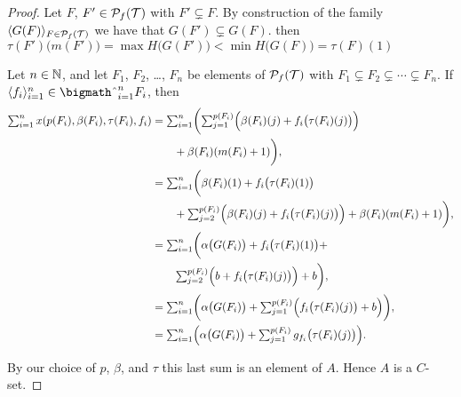 \begin{proof}
  Let $F$, $F' \in \mathcal{P}_f(\mathcal{T})$ with $F' \subsetneq F$. 
  By construction of the family $\langle G(F) \rangle_{F \in \mathcal{P}_f(\mathcal{T})}$ we have that $G(F') \subsetneq G(F)$.
  then $\tau(F')\bigl( m(F') \bigr) = \max H \bigl( G(F') \bigr) < \min H \bigl( G(F) \bigr) = \tau(F)(1)$

  Let $n \in \mathbb{N}$, and let $F_1$, $F_2$, \ldots, $F_n$ be elements of $\mathcal{P}_f(\mathcal{T})$ with $F_1 \subsetneq F_2 \subsetneq \cdots \subsetneq F_n$. 
  If $\la f_i \ra_{i=1}^n \in \bigtimes_{i=1}^n F_i$, then 
  \begin{align*}
    \textstyle
    \sum_{i=1}^n x(p(F_i), \beta(F_i), \tau(F_i), f_i) 
    &= \textstyle \sum_{i=1}^n \biggl( \sum_{j=1}^{p(F_i)} \Bigl( \beta(F_i)(j) + f_i\bigl(\tau(F_i)(j)\bigr)\Bigr) \\
    &\hspace{2em} + \beta(F_i)(m(F_i)+1) \biggr),  \\
    &= \textstyle \sum_{i=1}^n \biggl( \beta(F_i)(1) + f_i\bigl( \tau(F_i)(1)\bigr) \\ 
    &\hspace{2em} \textstyle + \sum_{j=2}^{p(F_i)} \Bigl( \beta(F_i)(j) + f_i\bigl(\tau(F_i)(j)\bigr)\Bigr) + \beta(F_i)(m(F_i)+1) \biggr), \\
    &= \textstyle \sum_{i=1}^n \biggl( \alpha\bigl( G(F_i) \bigr) + f_i\bigl( \tau(F_i)(1)\bigr) + \\
    &\hspace{2em} \textstyle \sum_{j=2}^{p(F_i)} \Bigl( b + f_i\bigl(\tau(F_i)(j)\bigr)\Bigr) + b \biggr), \\
    &= \textstyle \sum_{i=1}^n \biggl( \alpha\bigl( G(F_i) \bigr) +
    \textstyle \sum_{j=1}^{p(F_i)} \Bigl( f_i\bigl(\tau(F_i)(j)\bigr) + b\Bigr) \biggr), \\
    &= \textstyle \sum_{i=1}^n \Bigl( \alpha\bigl( G(F_i) \bigr) +
    \textstyle \sum_{j=1}^{p(F_i)} g_{f_i}\bigl(\tau(F_i)(j)\bigr) \Bigr).
  \end{align*}

  By our choice of $p$, $\beta$, and $\tau$ this last sum is an element of  $A$. 
  Hence $A$ is a $C$-set.

\end{proof}

 \theendnotes
